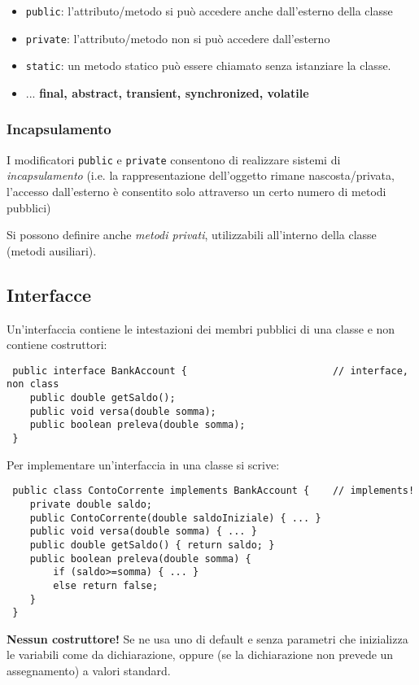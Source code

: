 \documentclass[a4paper,10pt]{article}
\begin{document}
\begin{itemize}
 \item \texttt{public}: l'attributo/metodo si può accedere anche dall'esterno della classe
 \item \texttt{private}: l'attributo/metodo non si può accedere dall'esterno
 \item \texttt{static}: un metodo statico può essere chiamato senza istanziare la classe.
 \item ... \textbf{final, abstract, transient, synchronized, volatile}
\end{itemize}
\subsubsection{Incapsulamento}
I modificatori \texttt{public} e \texttt{private} consentono di realizzare sistemi di \emph{incapsulamento} (i.e. la rappresentazione dell'oggetto rimane nascosta/privata, l'accesso dall'esterno è consentito solo attraverso un certo numero di metodi pubblici)\smallskip

Si possono definire anche \emph{metodi privati}, utilizzabili all'interno della classe (metodi ausiliari).\newpage

\subsection{Interfacce}
Un'interfaccia contiene le intestazioni dei membri pubblici di una classe e non contiene costruttori:
\begin{lstlisting}
 public interface BankAccount {                         // interface, non class
    public double getSaldo();
    public void versa(double somma);
    public boolean preleva(double somma);
 }
\end{lstlisting}

Per implementare un'interfaccia in una classe si scrive:
\begin{lstlisting}
 public class ContoCorrente implements BankAccount {    // implements!
    private double saldo;
    public ContoCorrente(double saldoIniziale) { ... }
    public void versa(double somma) { ... }
    public double getSaldo() { return saldo; }
    public boolean preleva(double somma) {
        if (saldo>=somma) { ... }
        else return false;
    }
 }
\end{lstlisting}

\textbf{Nessun costruttore!} Se ne usa uno di default e senza parametri che inizializza le variabili come da dichiarazione, oppure (se la dichiarazione non
prevede un assegnamento) a valori standard.
\end{document}
